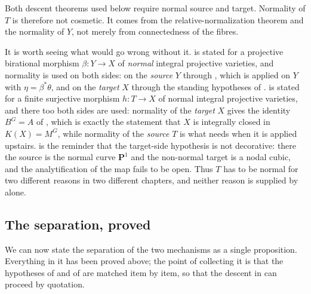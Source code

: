 \begin{remark}
\label{rem:ch42-normal-middle}
Both descent theorems used below require normal source and target.
Normality of $T$ is therefore not cosmetic.
It comes from the relative-normalization theorem and the normality of $Y$,
not merely from connectedness of the fibres.

It is worth seeing what would go wrong without it.
 is stated for a projective birational
morphism $\beta:Y\to X$ of \emph{normal} integral projective varieties,
and normality is used on both sides: on the \emph{source} $Y$ through
, which is applied on $Y$ with
$\eta=\beta^*\theta$, and on the \emph{target} $X$ through the standing
hypotheses of .
 is
stated for a finite surjective morphism $h:T\to X$ of normal integral
projective varieties, and there too both sides are used: normality of the
\emph{target} $X$ gives the identity $B^G=A$ of
, which is exactly the statement that $X$
is integrally closed in $K(X)=M^G$, while normality of the \emph{source}
$T$ is what  needs when it is applied
upstairs.   is the reminder that the
target-side hypothesis is not decorative: there the source is the normal
curve $\mathbf P^1$ and the non-normal target is a nodal cubic, and the
analytification of the map fails to be open.
Thus $T$ has to be normal for two different reasons in two different
chapters, and neither reason is supplied by
 alone.
\end{remark}

\subsection{The separation, proved}
\label{sec:ch42-separation}

We can now state the separation of the two mechanisms as a single
proposition.  Everything in it has been proved above; the point of
collecting it is that the hypotheses of
 and of
 are matched item by item, so that the
descent in  can proceed by quotation.

